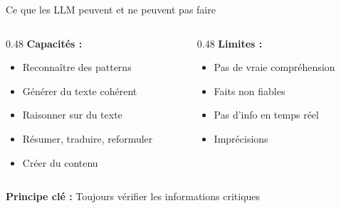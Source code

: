 \begin{frame}{Ce que les LLM peuvent et ne peuvent pas faire}

\begin{columns}
\begin{column}{0.48\textwidth}
    \textbf{Capacités :}
    \begin{itemize}
        \item Reconnaître des patterns
        \item Générer du texte cohérent
        \item Raisonner sur du texte
        \item Résumer, traduire, reformuler
        \item Créer du contenu
    \end{itemize}
\end{column}

\begin{column}{0.48\textwidth}
    \textbf{Limites :}
    \begin{itemize}
        \item Pas de vraie compréhension
        \item Faits non fiables
        \item Pas d'info en temps réel
        \item Imprécisions
    \end{itemize}
\end{column}
\end{columns}

\vspace{0.5cm}

\textbf{Principe clé :} Toujours vérifier les informations critiques

\end{frame}

